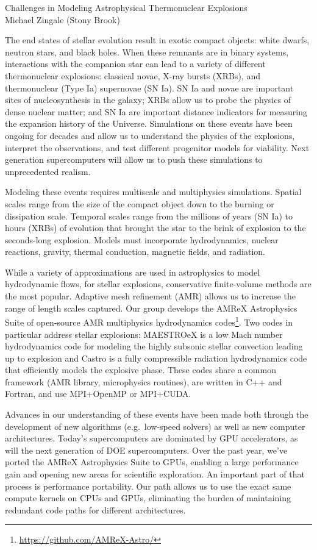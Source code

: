 \documentclass[11pt]{article}
\begin{document}
\begin{center}
{\large Challenges in Modeling Astrophysical Thermonuclear Explosions} \\[0.25em]
Michael Zingale (Stony Brook)
\end{center}

The end states of stellar evolution result in exotic compact objects:
white dwarfs, neutron stars, and black holes.  When these remnants are
in binary systems, interactions with the companion star can lead to a
variety of different thermonuclear explosions: classical novae, X-ray
bursts (XRBs), and thermonuclear (Type Ia) supernovae (SN Ia).  SN Ia
and novae are important sites of nucleosynthesis in the galaxy; XRBs
allow us to probe the physics of dense nuclear matter; and SN Ia are
important distance indicators for measuring the expansion history of
the Universe.  Simulations on these events have been ongoing for
decades and allow us to understand the physics of the explosions,
interpret the observations, and test different progenitor models for
viability.  Next generation supercomputers will allow us to push these
simulations to unprecedented realism.

Modeling these events requires multiscale and multiphysics simulations.
Spatial scales range from the size of the compact object
down to the burning or dissipation scale.  Temporal scales range from
the millions of years (SN Ia) to hours (XRBs) of evolution that
brought the star to the brink of explosion to the seconds-long
explosion.  Models must incorporate hydrodynamics, nuclear reactions,
gravity, thermal conduction, magnetic fields, and radiation.

While a variety of approximations are used in astrophysics to model
hydrodynamic flows, for stellar explosions, conservative finite-volume
methods are the most popular.  Adaptive mesh refinement (AMR) allows
us to increase the range of length scales captured.  Our group develops
the AMReX Astrophysics Suite of open-source AMR
multiphysics hydrodynamics
codes\footnote{\url{https://github.com/AMReX-Astro/}}.  Two codes in particular address stellar explosions: MAESTROeX
is a low Mach number hydrodynamics code for modeling the highly
subsonic stellar convection leading up to explosion and Castro is a
fully compressible radiation hydrodynamics code that efficiently
models the explosive phase.  These codes share a common framework
(AMR library, microphysics routines), are written in C++ and Fortran,
and use MPI+OpenMP or MPI+CUDA.

Advances in our understanding of these events have been made both
through the development of new algorithms (e.g.\ low-speed solvers) as
well as new computer architectures.  Today's supercomputers are
dominated by GPU accelerators, as will the next generation of
DOE supercomputers.  Over the past year,
we've ported the AMReX Astrophysics Suite to GPUs, enabling a large
performance gain and opening new areas for scientific exploration.  An
important part of that process is performance portability.  Our path
allows us to use the exact same compute kernels on CPUs and GPUs,
eliminating the burden of maintaining redundant code paths for
different architectures.
\end{document}
